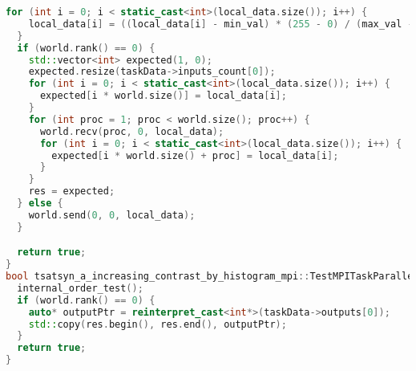 \documentclass[a4paper,12pt]{article}
\begin{document}
\begin{lstlisting}[language=C++]
  for (int i = 0; i < static_cast<int>(local_data.size()); i++) {
    local_data[i] = ((local_data[i] - min_val) * (255 - 0) / (max_val - min_val)) + 0;
  }
  if (world.rank() == 0) {
    std::vector<int> expected(1, 0);
    expected.resize(taskData->inputs_count[0]);
    for (int i = 0; i < static_cast<int>(local_data.size()); i++) {
      expected[i * world.size()] = local_data[i];
    }
    for (int proc = 1; proc < world.size(); proc++) {
      world.recv(proc, 0, local_data);
      for (int i = 0; i < static_cast<int>(local_data.size()); i++) {
        expected[i * world.size() + proc] = local_data[i];
      }
    }
    res = expected;
  } else {
    world.send(0, 0, local_data);
  }

  return true;
}
bool tsatsyn_a_increasing_contrast_by_histogram_mpi::TestMPITaskParallel::post_processing() {
  internal_order_test();
  if (world.rank() == 0) {
    auto* outputPtr = reinterpret_cast<int*>(taskData->outputs[0]);
    std::copy(res.begin(), res.end(), outputPtr);
  }
  return true;
}
\end{lstlisting}
\end{document}
